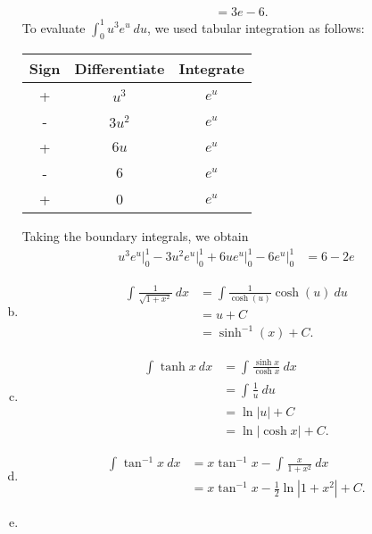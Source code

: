 \documentclass[10pt]{mypackage}
\begin{document}
\begin{enumerate}[(a)]
\begin{align*}
                                    &= 3e-6.
    \end{align*}
    To evaluate $\int_{0}^{1} u^{3}e^{u}\:du$, we used tabular integration as follows:
    \begin{center}
      \begin{tabular}{c|c|c}
        Sign & Differentiate & Integrate\\
        \hline
        + & $u^3$ & $e^u$\\
        - & $3u^2$ & $e^u$\\
        + & $6u$ & $e^u$\\
        - & $6$ & $e^u$\\
        + & 0 & $e^u$
      \end{tabular}
    \end{center}
      Taking the boundary integrals, we obtain
      \begin{align*}
          u^3e^u\bigr\vert_{0}^{1} - 3u^2e^u\bigr\vert_{0}^{1} + 6ue^u\bigr\vert_{0}^{1} - 6e^u\bigr\vert_{0}^{1} &= 6-2e
      \end{align*}
  \item 
    \begin{align*}
    \int_{}^{} \frac{1}{\sqrt{1+x^2}}\:dx &= \int\frac{1}{\cosh(u)}\cosh(u)\:du \tag*{$x = \sinh(u)$}\\
                                          &= u + C\\
                                          &= \sinh^{-1}\left(x\right) + C.
    \end{align*}
  \item 
    \begin{align*}
      \int_{}^{} \tanh x\:dx &= \int_{}^{} \frac{\sinh x}{\cosh x}\:dx\\
                             &= \int_{}^{} \frac{1}{u}\:du\tag*{$u = \cosh x$}\\
                             &= \ln\left\vert u \right\vert + C\\
                             &= \ln\left\vert \cosh x \right\vert + C.
    \end{align*}
  \item 
    \begin{align*}
      \int_{}^{} \tan^{-1}x\:dx &= x\tan^{-1}x - \int_{}^{} \frac{x}{1+x^2}\:dx\tag*{integration by parts}\\
                                &= x\tan^{-1}x - \frac{1}{2}\ln|1 + x^2| + C.\tag*{$u$-substitution implicit}
    \end{align*}
  \item 

\end{enumerate}
\end{document}
